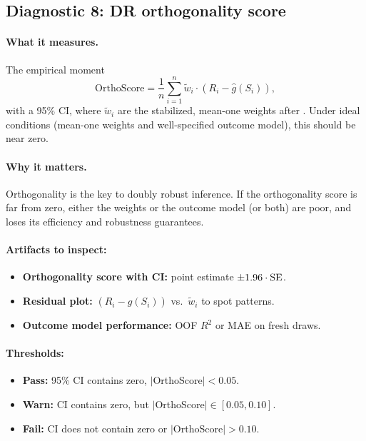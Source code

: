 \subsection{Diagnostic 8: DR orthogonality score}

\paragraph{What it measures.} The empirical moment
\begin{equation}
\text{OrthoScore} = \frac{1}{n} \sum_{i=1}^n \tilde{w}_i \cdot (R_i - \hat{g}(S_i)),
\end{equation}
with a 95\% CI, where $\tilde{w}_i$ are the stabilized, mean-one weights after \simcal. Under ideal conditions (mean-one weights and well-specified outcome model), this should be near zero.

\paragraph{Why it matters.} Orthogonality is the key to doubly robust inference. If the orthogonality score is far from zero, either the weights or the outcome model (or both) are poor, and \dr{} loses its efficiency and robustness guarantees.

\paragraph{Artifacts to inspect:}
\begin{itemize}
\item \textbf{Orthogonality score with CI:} point estimate $\pm 1.96 \cdot \operatorname{SE}$.
\item \textbf{Residual plot:} $(R_i - \hat{g}(S_i))$ vs.\ $\tilde{w}_i$ to spot patterns.
\item \textbf{Outcome model performance:} OOF $R^2$ or MAE on fresh draws.
\end{itemize}

\paragraph{Thresholds:}
\begin{itemize}
\item \textbf{Pass:} 95\% CI contains zero, $|$OrthoScore$| < 0.05$.
\item \textbf{Warn:} CI contains zero, but $|$OrthoScore$| \in [0.05, 0.10]$.
\item \textbf{Fail:} CI does not contain zero or $|$OrthoScore$| > 0.10$.
\end{itemize}

